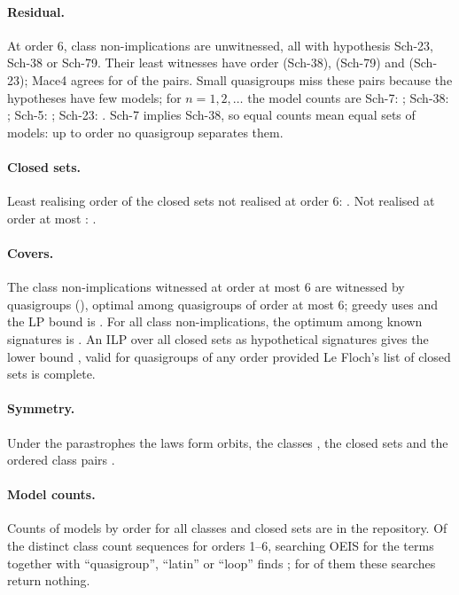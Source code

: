 \documentclass[11pt,a4paper]{article}
\newcommand{\Sch}[1]{\textsf{Sch-#1}}
\theoremstyle{definition}
\begin{document}
\paragraph{Residual.}
At order 6, \UnrefSix{} class non-implications are unwitnessed, all with hypothesis
\Sch{23}, \Sch{38} or \Sch{79}. Their least witnesses have order \WitThirtyEight{}
(\Sch{38}), \WitSeventyNine{} (\Sch{79}) and \WitTwentyThree{} (\Sch{23}); Mace4 agrees
for \MaceAgree{} of the \ResidualPairs{} pairs. Small quasigroups miss these pairs
because the hypotheses have few models; for $n = 1, 2, \dots$ the model counts are
\Sch{7}: \CountsSeven; \Sch{38}: \CountsThirtyEight; \Sch{5}: \CountsFive;
\Sch{23}: \CountsTwentyThree. \Sch{7} implies \Sch{38}, so equal counts mean equal sets
of models: up to order \SevenThirtyEightSameUpTo{} no quasigroup separates them.

\paragraph{Closed sets.}
Least realising order of the \NGenerators{} closed sets not realised at order 6:
\VarLeastHist. Not realised at order at most \LastOrder: \MissingLastList.

\paragraph{Covers.}
The \CoverUniverse{} class non-implications witnessed at order at most 6 are
witnessed by \CoverILP{} quasigroups (\CoverProfile), optimal among quasigroups of
order at most 6; greedy uses \CoverGreedy{} and the LP bound is \CoverLP. For all
\ClassNonImp{} class non-implications, the optimum among known signatures is
\FullCover. An ILP over all \NVarieties{} closed sets as hypothetical signatures gives
the lower bound \FullCoverLB, valid for quasigroups of any order provided Le Floch's
list of closed sets is complete.

\paragraph{Symmetry.}
Under the parastrophes the \NLaws{} laws form \LawOrbits{} orbits, the classes
\ClassOrbits, the closed sets \VarOrbits{} and the ordered class pairs
\ClassPairOrbits.

\paragraph{Model counts.}
Counts of models by order for all classes and closed sets are in the repository. Of
the \OeisSeqs{} distinct class count sequences for orders 1--6, searching OEIS for the
terms together with ``quasigroup'', ``latin'' or ``loop'' finds \OeisMatched; for
\OeisNone{} of them these searches return nothing.
\end{document}
